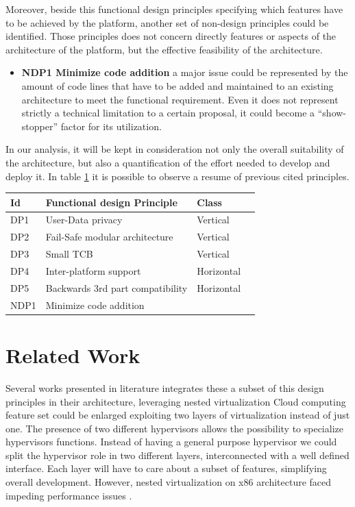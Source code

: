 \documentclass{acm_proc_article-sp} %
\begin{document}
Moreover, beside this functional design principles specifying which features have to be achieved by the platform, another set of non-design principles could be identified. Those principles does not concern directly features or aspects of the architecture of the platform, but the effective feasibility of the architecture. 
\begin{itemize}[]
\item \textbf{NDP1 Minimize code addition} a major issue could be represented by the amount of code lines that have to be added and maintained to an existing architecture to meet the functional requirement. Even it does not represent strictly a technical limitation to a certain proposal, it could become a ``show-stopper'' factor for its utilization.
\end{itemize}
In our analysis, it will be kept in consideration not only the overall suitability of the architecture, but also a quantification of the effort needed to develop and deploy it. In table \ref{int:des} it is possible to observe a resume of previous cited principles.
 
\begin{table}
\label{int:des}
\begin{tabular}{llll}
\toprule
Id & Functional design Principle & Class &\\
\midrule
   DP1 & User-Data privacy & Vertical & \\
   DP2 & Fail-Safe modular architecture & Vertical & \\ 
   DP3 & Small TCB & Vertical & \\
   DP4 & Inter-platform support & Horizontal & \\
   DP5 & Backwards 3rd part compatibility & Horizontal \\
   NDP1 & Minimize code addition & & \\
\bottomrule
      \end{tabular}
\end{table}



\section{Related Work}
Several works presented in literature integrates these a subset of this design principles in their architecture, leveraging nested virtualization \cite{turtle:ibm,art:blan, cloudvisor:zhang}
Cloud computing feature set could be enlarged exploiting two layers of virtualization instead of just one. The presence of two different hypervisors allows the possibility to specialize hypervisors functions. Instead of having a general purpose hypervisor we could split the hypervisor role in two different layers, interconnected with a well defined interface.
Each layer will have to care about a subset of features, simplifying overall development.
However, nested virtualization on x86 architecture faced impeding performance issues \cite{rec:virt}.
\end{document}
